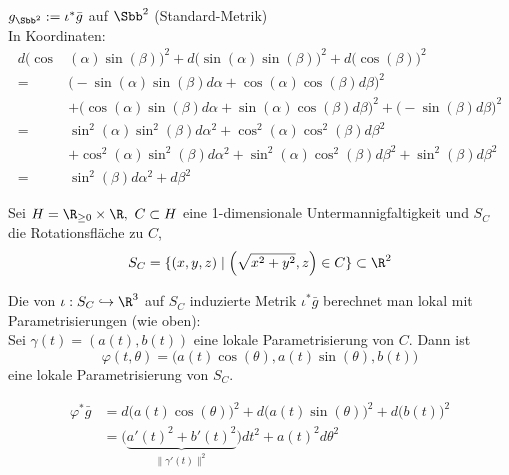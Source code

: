 \begin{exmp*}
	$ g_{\Sbb^2} := \iota^*\bar{g} $ auf $\Sbb^2$ \hfill (Standard-Metrik)\\
	In Koordinaten:
	\begin{align*}
		d\big(\cos&(\alpha) \sin(\beta)\big)^2 + d\big(\sin(\alpha)\sin(\beta)\big)^2 + d\big(\cos(\beta)\big)^2 \\
		=& \big(-\sin(\alpha)\sin(\beta)d\alpha + \cos(\alpha)\cos(\beta)d\beta\big)^2 \\
		&+ \big(\cos(\alpha)\sin(\beta)d\alpha + \sin(\alpha)\cos(\beta)d\beta\big)^2 + \big(-\sin(\beta)d\beta\big)^2\\
		=& \sin^2(\alpha) \sin^2(\beta) d\alpha^2 + \cos^2(\alpha) \cos^2(\beta) d\beta^2\\
		&+ \cos^2(\alpha) \sin^2(\beta) d\alpha^2 + \sin^2(\alpha) \cos^2(\beta) d\beta^2 + \sin^2(\beta) d\beta^2\\
		=& \sin^2(\beta) d\alpha^2 + d\beta^2
	\end{align*}
\end{exmp*}

\begin{exmp*}
	Sei $ H = \R_{\geq 0} \times \R,\ C \subset H $ eine 1-dimensionale Untermannigfaltigkeit und $ S_C $ die Rotationsfläche zu $C$,
	\[ S_C = \{(x,y,z) \mid \left( \sqrt{x^2+y^2},z \right) \in C \} \subset \R^2 \]
	\begin{minipage}{\linewidth}
		\begin{wrapfigure}{l}{6cm}
		\end{wrapfigure}
		Die von $\iota: S_C \hookrightarrow \R^3$ auf $S_C$ induzierte Metrik $\iota^*\bar{g}$ berechnet man lokal mit Parametrisierungen (wie oben):\\
		Sei $ \gamma(t) = (a(t),b(t)) $ eine lokale Parametrisierung von $C$. Dann ist
		\[ \varphi(t,\theta) = \big( a(t)\cos(\theta), a(t)\sin(\theta),b(t) \big) \]
		eine lokale Parametrisierung von $S_C$.
	\end{minipage}
	\begin{align*}
		\varphi^*\bar{g} &= d\big( a(t)\cos(\theta) \big)^2 + d\big( a(t)\sin(\theta) \big)^2 + d\big( b(t) \big)^2\\
		&= \big( \underbrace{a'(t)^2 + b'(t)^2}_{\|\gamma'(t)\|^2} \big)dt^2 + a(t)^2d\theta^2
	\end{align*}
\end{exmp*}

\subsection*{}

